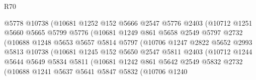 \begin{lexlean}{R70}
\begin{coremodule}
                          @5778
                          @10738
                          (@10681
                            @1252
                            @152
                            @5666
                            @2547
                            @5776
                            @2403
                            (@10712
                              @1251
                              @5660
                              @5665
                              @5799
                              @5776
                              (@10681
                                @1249
                                @861
                                @5658
                                @2549
                                @5797
                                @2732
                                (@10688
                                  @1248
                                  @5653
                                  @5657
                                  @5814
                                  @5797
                                  (@10706
                                    @1247
                                    @2822
                                    @5652
                                    @2993
                                    @5813
                                    @10738
                                    (@10681
                                      @1245
                                      @152
                                      @5650
                                      @2547
                                      @5811
                                      @2403
                                      (@10712
                                        @1244
                                        @5644
                                        @5649
                                        @5834
                                        @5811
                                        (@10681
                                          @1242
                                          @861
                                          @5642
                                          @2549
                                          @5832
                                          @2732
                                          (@10688
                                            @1241
                                            @5637
                                            @5641
                                            @5847
                                            @5832
                                            (@10706
                                              @1240

\end{coremodule}
\end{lexlean}
